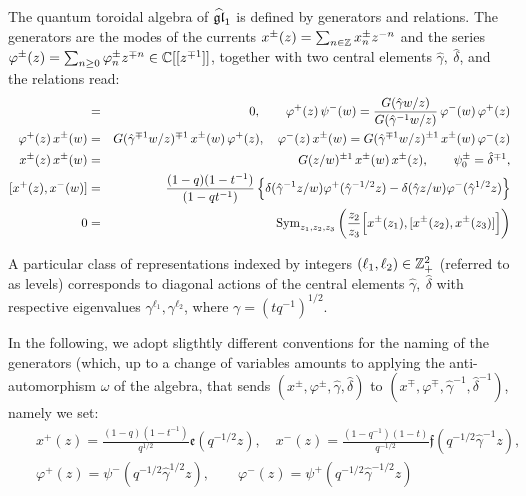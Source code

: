 \begin{defn}\label{qtorgendef}
The quantum toroidal algebra of $\widehat{{\mathfrak{gl}}}_1$ is defined by generators and relations. The generators are
the modes of the currents $x^\pm(z)=\sum_{n\in {\mathbb Z}} x_n^{\pm} z^{-n}$ and the series
$\varphi^\pm(z)=\sum_{n\geq 0} \varphi_n^{\pm} z^{\mp n}\in {\mathbb C}[[z^{\mp 1}]]$, together with two central elements
${\hat \gamma},\ {\hat \delta}$, and the relations read:
\begin{eqnarray*}
[\varphi^\pm(z),\psi^\pm(w)]&=&0,\qquad \varphi^+(z)\,\psi^-(w)=\frac{G({\hat \gamma}w/z)}{G({\hat \gamma}^{-1}w/z)}\,
\varphi^-(w)\,\varphi^+(z)\\
\varphi^+(z)\, x^\pm(w)&=&G({\hat \gamma}^{\mp 1}w/z)^{\mp 1}\, x^\pm(w)\,\varphi^+(z),\quad 
\varphi^-(z)\, x^\pm(w)=G({\hat \gamma}^{\mp 1}w/z)^{\pm 1}\, x^\pm(w)\,\varphi^-(z)\\
x^\pm(z)\, x^\pm(w)&=&G(z/w)^{\pm 1} \, x^\pm(w)\, x^\pm(z), \qquad \psi_0^\pm={\hat \delta}^{\mp 1},\\
{[} x^+(z), x^-(w) {] }&=& \frac{(1-q)(1-t^{-1})}{(1-q t^{-1})} \left\{ \delta({\hat \gamma}^{-1}z/w)\varphi^+({\hat \gamma}^{-1/2}z)
-\delta({\hat \gamma} z/w)\varphi^-({\hat \gamma}^{1/2}z)\right\}  \\
0&=&{\rm Sym}_{z_1,z_2,z_3}\left( \frac{z_2}{z_3} {\Big[}{ x^\pm}(z_1),{[}{x^\pm}(z_2),{ x^\pm}(z_3){]}{\Big]}\right)
\end{eqnarray*}
\end{defn}

A particular class of representations \cite{FHHSY} indexed by integers $(\ell_1,\ell_2)\in {\mathbb Z}_+^2$ (referred to as levels)
corresponds to diagonal actions of the central elements ${\hat \gamma},\ {\hat \delta}$
with respective eigenvalues $\gamma^{\ell_1},\gamma^{\ell_2}$, where $\gamma=(t q^{-1})^{1/2}$.

In the following, we adopt sligthtly different conventions for the naming of the generators (which, up to a change of variables
amounts to applying the anti-automorphism $\omega$ of the algebra, that sends $(x^\pm,\varphi^\pm,{\hat \gamma},{\hat \delta})$
to $(x^\mp,\varphi^\mp,{\hat \gamma}^{-1},{\hat \delta}^{-1})$, namely we set:
\begin{eqnarray}
&&x^+(z)=\frac{(1-q)(1-t^{-1})}{q^{1/2}}{\mathfrak e}(q^{-1/2}z),\quad x^-(z)
=\frac{(1-q^{-1})(1-t)}{q^{-1/2}}{\mathfrak f}(q^{-1/2} {\hat \gamma}^{-1}z),\nonumber \\ 
&&\varphi^+(z)=\psi^-(q^{-1/2}{\hat \gamma}^{1/2}z),\qquad \varphi^-(z)=\psi^+(q^{-1/2}{\hat \gamma}^{-1/2}z)
\label{dictio}
\end{eqnarray}



